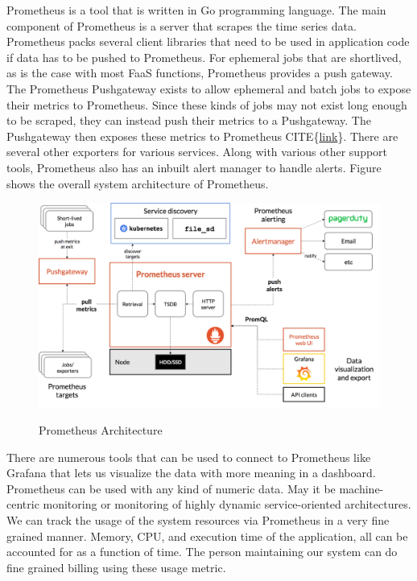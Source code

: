 \documentclass[12pt,titlepage]{article}
\begin{document}
Prometheus is a tool that is written in Go programming language. The main
component of Prometheus is a server that scrapes the time series data.
Prometheus packs several client libraries that need to be used in application
code if data has to be pushed to Prometheus. For ephemeral jobs that are
shortlived, as is the case with most FaaS functions, Prometheus provides a push
gateway. The Prometheus Pushgateway exists to allow ephemeral and batch jobs to expose
their metrics to Prometheus. Since these kinds of jobs may not exist long enough
to be scraped, they can instead push their metrics to a Pushgateway. The
Pushgateway then exposes these metrics to Prometheus CITE\{\href{https://github.com/prometheus/pushgateway}{link}\}. There are
several other exporters for various services. Along with various other support
tools, Prometheus also has an inbuilt alert manager to handle alerts. Figure
shows the overall system architecture of Prometheus.

\begin{figure}[!h]
    \caption{Prometheus Architecture}
    \centering
    \includegraphics[width=130mm]{./thesis_images/prometheus.png}
    \label{fig:prometheus}
\end{figure}

There are numerous tools that can be used to connect to Prometheus like Grafana
that lets us visualize the data with more meaning in a dashboard. Prometheus can
be used with any kind of numeric data. May it be machine-centric monitoring or
monitoring of highly dynamic service-oriented architectures. We can track the
usage of the system resources via Prometheus in a very fine grained manner.
Memory, CPU, and execution time of the application, all can be accounted for as
a function of time. The person maintaining our system can do fine grained
billing using these usage metric.
\end{document}
